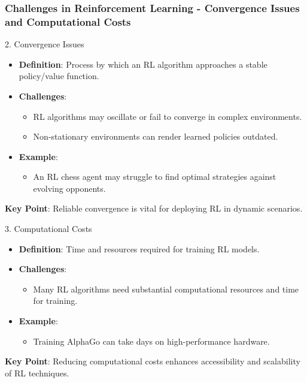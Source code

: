\documentclass[aspectratio=169]{beamer}
\begin{document}
\begin{frame}[fragile]
    \frametitle{Challenges in Reinforcement Learning - Convergence Issues and Computational Costs}
    \begin{block}{2. Convergence Issues}
        \begin{itemize}
            \item \textbf{Definition}: Process by which an RL algorithm approaches a stable policy/value function.
            \item \textbf{Challenges}:
            \begin{itemize}
                \item RL algorithms may oscillate or fail to converge in complex environments.
                \item Non-stationary environments can render learned policies outdated.
            \end{itemize}
            \item \textbf{Example}: 
            \begin{itemize}
                \item An RL chess agent may struggle to find optimal strategies against evolving opponents.
            \end{itemize}
        \end{itemize}
        \textbf{Key Point}: Reliable convergence is vital for deploying RL in dynamic scenarios.
    \end{block}
    
    \begin{block}{3. Computational Costs}
        \begin{itemize}
            \item \textbf{Definition}: Time and resources required for training RL models.
            \item \textbf{Challenges}:
            \begin{itemize}
                \item Many RL algorithms need substantial computational resources and time for training.
            \end{itemize}
            \item \textbf{Example}: 
            \begin{itemize}
                \item Training AlphaGo can take days on high-performance hardware.
            \end{itemize}
        \end{itemize}
        \textbf{Key Point}: Reducing computational costs enhances accessibility and scalability of RL techniques.
    \end{block}
\end{frame}
\end{document}
